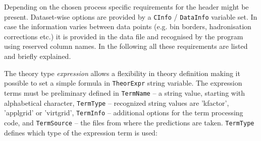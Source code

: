 Depending on the chosen process specific requirements for the header might be present. 
Dataset-wise options are provided by a {\tt CInfo} / {\tt DataInfo} variable set. In case the information
varies between data points (e.g. bin borders, hadronisation corrections etc.) it is
provided in the data file and recognised by the program using reserved column names.
In the following all these requirements are listed and briefly explained.

The theory type {\it expression} allows a flexibility in theory definition
making it possible to set a simple formula in {\tt TheorExpr} string variable.
The expression terms must be preliminary defined in {\tt TermName} -- a string
value, starting with alphabetical character, {\tt TermType} -- recognized string values
are 'kfactor', 'applgrid' or 'virtgrid', {\tt TermInfo} -- additional
options for the term processing code, and {\tt TermSource} -- the files from
where the predictions are taken. {\tt TermType} defines which type of the
expression term is used:
